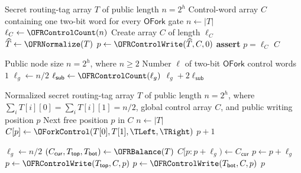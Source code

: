 \begin{algorithm}[t]
\caption{$\OFRControl(T)$}
\label{alg:ofr-control}
\begin{algorithmic}[1]
\Require Secret routing-tag array $T$ of public length $n=2^h$
\Ensure Control-word array $C$ containing one two-bit word for every
$\mathsf{OFork}$ gate
\State $n \gets |T|$
\State $\ell_C \gets \OFRControlCount(n)$
\State Create array $C$ of length $\ell_C$
\State $\widehat{T} \gets \OFRNormalize(T)$
\State $p \gets \OFRControlWrite(\widehat{T},C,0)$
\State \textbf{assert} $p=\ell_C$
\State \Return $C$
\end{algorithmic}
\end{algorithm}


\begin{algorithm}[t]
\caption{$\OFRControlCount(n)$}
\label{alg:ofr-control-count}
\begin{algorithmic}[1]
\Require Public node size $n=2^h$, where $n\geq 2$
\Ensure Number $\ell$ of two-bit $\mathsf{OFork}$ control words
    \State \Return $1$
\EndIf
\State $\ell_g \gets n/2$
\State $\ell_{\mathsf{sub}} \gets \OFRControlCount(\ell_g)$
\State \Return $\ell_g+2\ell_{\mathsf{sub}}$
\end{algorithmic}
\end{algorithm}

\begin{algorithm}[t]
\caption{$\OFRControlWrite(T,C,p)$}
\label{alg:ofr-control-write}
\begin{algorithmic}[1]
\Require Normalized secret routing-tag array $T$ of public length
$n=2^h$, where
$\sum_i T[i][0]=\sum_i T[i][1]=n/2$,
global control array $C$, and public writing position $p$
\Ensure Next free position $p$ in $C$
\State $n \gets |T|$
    \State $C[p] \gets \OForkControl(T[0],T[1],\TLeft,\TRight)$
    \State \Return $p+1$
\EndIf

\State $\ell_g \gets n/2$
\State $(C_{\mathsf{cur}},T_{\mathsf{top}},T_{\mathsf{bot}})
       \gets \OFRBalance(T)$
\State $C[p:p+\ell_g) \gets C_{\mathsf{cur}}$
\State $p \gets p+\ell_g$
\State $p \gets \OFRControlWrite(T_{\mathsf{top}},C,p)$
\State $p \gets \OFRControlWrite(T_{\mathsf{bot}},C,p)$
\State \Return $p$
\end{algorithmic}
\end{algorithm}

